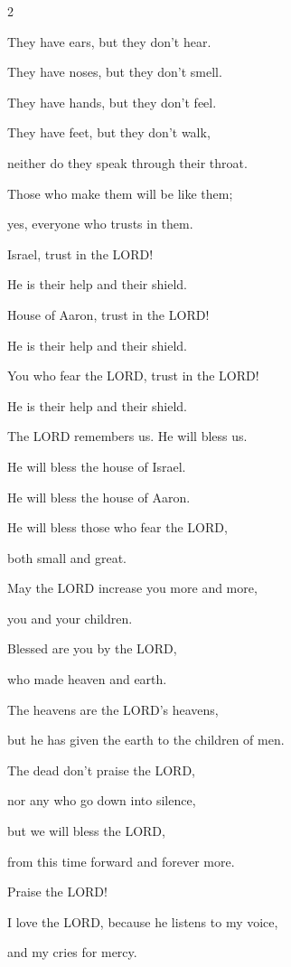 \begin{multicols}{2}
	
	\myverse{}They have ears, but they don’t hear.
	
	They have noses, but they don’t smell.
	
	
	\myverse{}They have hands, but they don’t feel.
	
	They have feet, but they don’t walk,
	
	neither do they speak through their throat.
	
	
	\myverse{}Those who make them will be like them;
	
	yes, everyone who trusts in them.
	
	
	\myverse{}Israel, trust in the LORD!
	
	He is their help and their shield.
	
	
	\myverse{}House of Aaron, trust in the LORD!
	
	He is their help and their shield.
	
	
	\myverse{}You who fear the LORD, trust in the LORD!
	
	He is their help and their shield.
	
	
	\myverse{}The LORD remembers us. He will bless us.
	
	He will bless the house of Israel.
	
	He will bless the house of Aaron.
	
	
	\myverse{}He will bless those who fear the LORD,
	
	both small and great.
	
	
	\myverse{}May the LORD increase you more and more,
	
	you and your children.
	
	
	\myverse{}Blessed are you by the LORD,
	
	who made heaven and earth.
	
	
	\myverse{}The heavens are the LORD’s heavens,
	
	but he has given the earth to the children of men.
	
	
	\myverse{}The dead don’t praise the LORD,
	
	nor any who go down into silence,
	
	
	\myverse{}but we will bless the LORD,
	
	from this time forward and forever more.
	
	Praise the LORD!
	
	
	\mychapter{} \myverse*{}I love the LORD, because he listens to my voice,
	
	and my cries for mercy.
	

\end{multicols}

